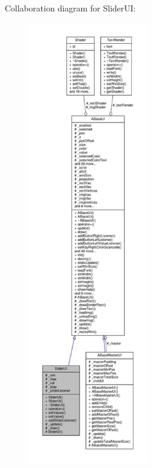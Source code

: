 Collaboration diagram for Slider\+UI\+:
\nopagebreak
\begin{figure}[H]
\begin{center}
\leavevmode
\includegraphics[height=550pt]{class_slider_u_i__coll__graph}
\end{center}
\end{figure}
